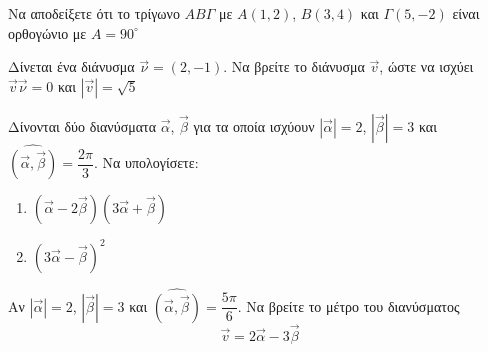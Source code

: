 \documentclass{presentation}
\begin{document}
\begin{askisi}
  Να αποδείξετε ότι το τρίγωνο $ΑΒΓ$ με $Α(1,2)$, $Β(3,4)$ και $Γ(5,-2)$ είναι ορθογώνιο με $Α=90^{\circ}$
\end{askisi}

\begin{askisi}
  Δίνεται ένα διάνυσμα $\vec{\nu}=(2,-1)$. Να βρείτε το διάνυσμα $\vec{v}$, ώστε να ισχύει $\vec{v}\vec{\nu}=0$ και $|\vec{v}|=\sqrt{5}$
\end{askisi}

\begin{askisi}
  Δίνονται δύο διανύσματα $\vec{α}$, $\vec{β}$ για τα οποία ισχύουν $|\vec{α}|=2$, $|\vec{β}|=3$ και $\widehat{(\vec{α }, \vec{β })}=\dfrac{2\pi}{3}$. Να υπολογίσετε:
  \begin{enumerate}
    \item<1-> $(\vec{α}-2\vec{β})(3\vec{α}+\vec{β})$
    \item<2-> $(3\vec{α}-\vec{β})^2$
  \end{enumerate}


\end{askisi}







\begin{askisi}
  Αν $|\vec{α}|=2$, $|\vec{β}|=3$ και $\widehat{(\vec{α }, \vec{β })}=\dfrac{5\pi}{6}$. Να βρείτε το μέτρο του διανύσματος
  $$\vec{v}=2\vec{α}-3\vec{β}$$

\end{askisi}
\end{document}
